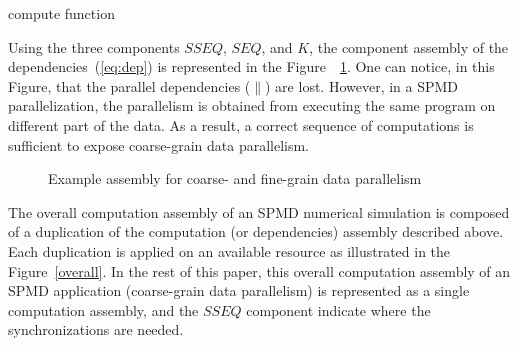  \begin{center}
 \begin{algorithm}[H]
 \caption{compute function}
 \label{alg:comp}
 \end{algorithm}
 \end{center}
Using the three components $SSEQ$, $SEQ$, and $K$, the component assembly of the dependencies~(\ref{eq:dep}) is represented in the Figure~~\ref{exdataparall}. One can notice, in this Figure, that the parallel dependencies ($\parallel$) are lost. However, in a SPMD parallelization, the parallelism is obtained from executing the same program on different part of the data. As a result, a correct sequence of computations is sufficient to expose coarse-grain data parallelism.
\begin{figure}[h!]
\begin{center}
\caption{Example assembly for coarse- and fine-grain data parallelism}
\label{exdataparall}
\end{center}
\end{figure}
The overall computation assembly of an SPMD numerical simulation is composed of a duplication of the computation (or dependencies) assembly described above. Each duplication is applied on an available resource as illustrated in the Figure~\ref{overall}. In the rest of this paper, this overall computation assembly of an SPMD application (coarse-grain data parallelism) is represented as a single computation assembly, and the $SSEQ$ component indicate where the synchronizations are needed.

